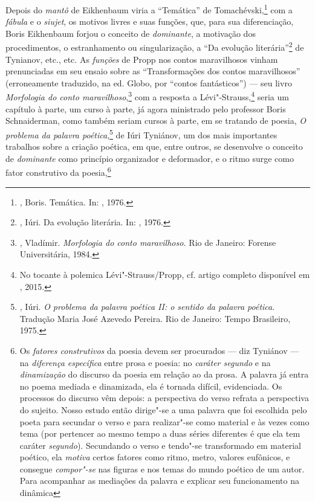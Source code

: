 {Depois do \emph{mantô} de Eikhenbaum viria a ``Temática'' de
Tomachévski,\footnote{, Boris. Temática. In:
 , 1976.} com a \emph{fábula} e o \emph{siujet}, os motivos livres e
suas funções, que, para sua diferenciação, Boris Eikhenbaum forjou o conceito
de \emph{dominante}, a motivação dos procedimentos, o estranhamento ou
singularização, a ``Da evolução literária''\footnote{, Iúri. Da evolução literária.
 In: , 1976.} de Tynianov, etc., etc. As
\emph{funções} de Propp nos contos maravilhosos vinham prenunciadas
em seu ensaio sobre as ``Transformações dos contos maravilhosos''
(erroneamente traduzido, na ed. Globo, por ``contos fantásticos'') --- seu livro
\emph{Morfologia do conto maravilhoso},\footnote{, 
Vladímir. \emph{Morfologia do conto maravilhoso.} Rio de Janeiro:
 Forense Universitária, 1984.} com a resposta a
Lévi"-Strauss,\footnote{No tocante à polemica Lévi"-Strauss/Propp,
 cf. artigo completo disponível em , 2015.} seria um capítulo à parte, um curso à
parte, já agora ministrado pelo professor Boris Schnaiderman, como também seriam cursos
à parte, em se tratando de poesia, \emph{O problema da palavra poética},\footnote{, Iúri. 
\emph{O problema da palavra poética II: o sentido da palavra poética}.
 Tradução Maria José Azevedo Pereira. Rio de Janeiro: Tempo Brasileiro,
 1975.}
de Iúri Tyniánov, um dos mais importantes trabalhos sobre a
criação poética, em que, entre outros, se desenvolve o conceito de
\emph{dominante} como princípio organizador e deformador, e o ritmo surge como
fator construtivo da poesia,\footnote{Os \emph{fatores 
construtivos} da poesia devem ser procurados --- diz Tyniánov --- na 
\emph{diferença específica} entre prosa e poesia: no \emph{caráter 
segundo} e na \emph{dinamização} do discurso da poesia em relação ao 
da prosa. A palavra já entra no poema mediada e dinamizada, ela é 
tornada difícil, evidenciada. Os processos do discurso vêm depois:
 a perspectiva do verso refrata a perspectiva do sujeito. Nosso estudo 
então dirige"-se a uma palavra que foi escolhida pelo poeta para 
secundar o verso e para realizar"-se como material e às vezes como
 tema (por pertencer ao mesmo tempo a duas séries diferentes é que
 ela tem caráter \emph{segundo}). Secundando o verso e tendo"-se
transformado em material poético, ela \emph{motiva} certos fatores 
como ritmo, metro, valores eufônicos, e consegue \emph{compor"-se} 
nas figuras e nos temas do mundo poético de um autor. Para acompanhar
 as mediações da palavra e explicar seu funcionamento na dinâmica
}}
